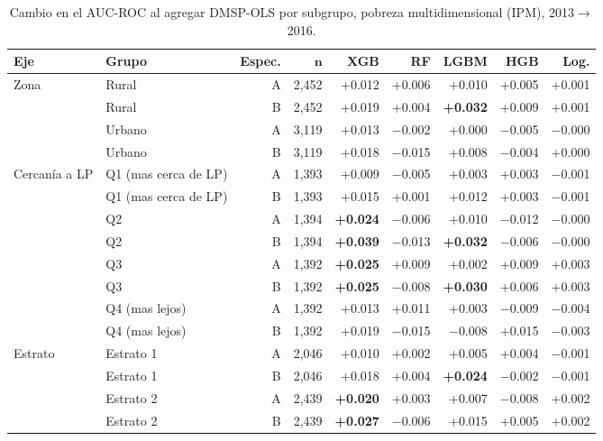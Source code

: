 \begin{table}[H]
  \centering
  \caption{Cambio en el AUC-ROC al agregar DMSP-OLS por subgrupo, pobreza multidimensional (IPM), 2013$\to$2016.}
  \label{tab:heterogeneidad_ipm}
  \footnotesize
  \setlength{\tabcolsep}{3pt}
  \begin{tabular}{llrrrrrrr}
    \toprule
    \textbf{Eje} & \textbf{Grupo} & \textbf{Espec.} & $\boldsymbol{n}$ & \textbf{XGB} & \textbf{RF} & \textbf{LGBM} & \textbf{HGB} & \textbf{Log.} \\
    \midrule
    Zona & Rural & A & 2{,}452 & +0.012 & +0.006 & +0.010 & +0.005 & +0.001 \\
     & Rural & B & 2{,}452 & +0.019 & +0.004 & \textbf{+0.032} & +0.009 & +0.001 \\
    \addlinespace
     & Urbano & A & 3{,}119 & +0.013 & $-$0.002 & +0.000 & $-$0.005 & $-$0.000 \\
     & Urbano & B & 3{,}119 & +0.018 & $-$0.015 & +0.008 & $-$0.004 & +0.000 \\
    \midrule
    Cercanía a LP & Q1 (mas cerca de LP) & A & 1{,}393 & +0.009 & $-$0.005 & +0.003 & +0.003 & $-$0.001 \\
     & Q1 (mas cerca de LP) & B & 1{,}393 & +0.015 & +0.001 & +0.012 & +0.003 & $-$0.001 \\
    \addlinespace
     & Q2 & A & 1{,}394 & \textbf{+0.024} & $-$0.006 & +0.010 & $-$0.012 & $-$0.000 \\
     & Q2 & B & 1{,}394 & \textbf{+0.039} & $-$0.013 & \textbf{+0.032} & $-$0.006 & $-$0.000 \\
    \addlinespace
     & Q3 & A & 1{,}392 & \textbf{+0.025} & +0.009 & +0.002 & +0.009 & +0.003 \\
     & Q3 & B & 1{,}392 & \textbf{+0.025} & $-$0.008 & \textbf{+0.030} & +0.006 & +0.003 \\
    \addlinespace
     & Q4 (mas lejos) & A & 1{,}392 & +0.013 & +0.011 & +0.003 & $-$0.009 & $-$0.004 \\
     & Q4 (mas lejos) & B & 1{,}392 & +0.019 & $-$0.015 & $-$0.008 & +0.015 & $-$0.003 \\
    \midrule
    Estrato & Estrato 1 & A & 2{,}046 & +0.010 & +0.002 & +0.005 & +0.004 & $-$0.001 \\
     & Estrato 1 & B & 2{,}046 & +0.018 & +0.004 & \textbf{+0.024} & $-$0.002 & $-$0.001 \\
    \addlinespace
     & Estrato 2 & A & 2{,}439 & \textbf{+0.020} & +0.003 & +0.007 & $-$0.008 & +0.002 \\
     & Estrato 2 & B & 2{,}439 & \textbf{+0.027} & $-$0.006 & +0.015 & +0.005 & +0.002 \\

\end{tabular}
\end{table}
